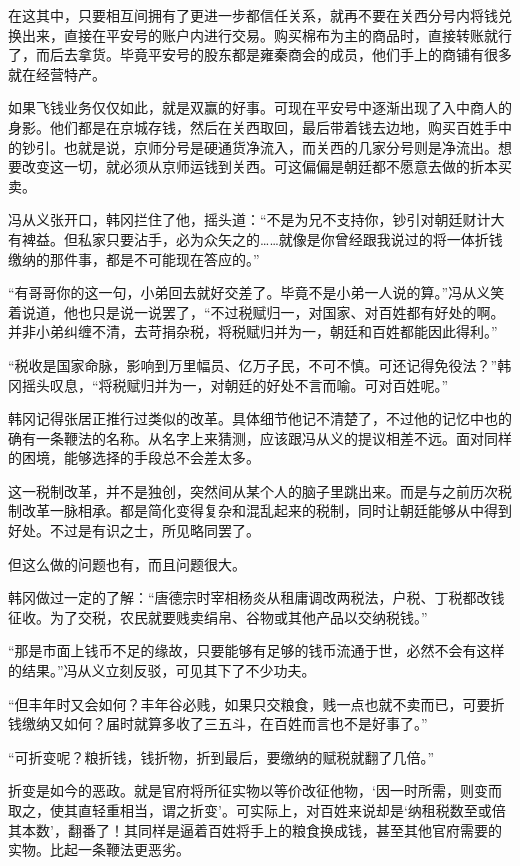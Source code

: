 在这其中，只要相互间拥有了更进一步都信任关系，就再不要在关西分号内将钱兑换出来，直接在平安号的账户内进行交易。购买棉布为主的商品时，直接转账就行了，而后去拿货。毕竟平安号的股东都是雍秦商会的成员，他们手上的商铺有很多就在经营特产。

如果飞钱业务仅仅如此，就是双赢的好事。可现在平安号中逐渐出现了入中商人的身影。他们都是在京城存钱，然后在关西取回，最后带着钱去边地，购买百姓手中的钞引。也就是说，京师分号是硬通货净流入，而关西的几家分号则是净流出。想要改变这一切，就必须从京师运钱到关西。可这偏偏是朝廷都不愿意去做的折本买卖。

冯从义张开口，韩冈拦住了他，摇头道：“不是为兄不支持你，钞引对朝廷财计大有裨益。但私家只要沾手，必为众矢之的……就像是你曾经跟我说过的将一体折钱缴纳的那件事，都是不可能现在答应的。”

“有哥哥你的这一句，小弟回去就好交差了。毕竟不是小弟一人说的算。”冯从义笑着说道，他也只是说一说罢了，“不过税赋归一，对国家、对百姓都有好处的啊。并非小弟纠缠不清，去苛捐杂税，将税赋归并为一，朝廷和百姓都能因此得利。”

“税收是国家命脉，影响到万里幅员、亿万子民，不可不慎。可还记得免役法？”韩冈摇头叹息，“将税赋归并为一，对朝廷的好处不言而喻。可对百姓呢。”

韩冈记得张居正推行过类似的改革。具体细节他记不清楚了，不过他的记忆中也的确有一条鞭法的名称。从名字上来猜测，应该跟冯从义的提议相差不远。面对同样的困境，能够选择的手段总不会差太多。

这一税制改革，并不是独创，突然间从某个人的脑子里跳出来。而是与之前历次税制改革一脉相承。都是简化变得复杂和混乱起来的税制，同时让朝廷能够从中得到好处。不过是有识之士，所见略同罢了。

但这么做的问题也有，而且问题很大。

韩冈做过一定的了解：“唐德宗时宰相杨炎从租庸调改两税法，户税、丁税都改钱征收。为了交税，农民就要贱卖绢帛、谷物或其他产品以交纳税钱。”

“那是市面上钱币不足的缘故，只要能够有足够的钱币流通于世，必然不会有这样的结果。”冯从义立刻反驳，可见其下了不少功夫。

“但丰年时又会如何？丰年谷必贱，如果只交粮食，贱一点也就不卖而已，可要折钱缴纳又如何？届时就算多收了三五斗，在百姓而言也不是好事了。”

“可折变呢？粮折钱，钱折物，折到最后，要缴纳的赋税就翻了几倍。”

折变是如今的恶政。就是官府将所征实物以等价改征他物，‘因一时所需，则变而取之，使其直轻重相当，谓之折变’。可实际上，对百姓来说却是‘纳租税数至或倍其本数’，翻番了！其同样是逼着百姓将手上的粮食换成钱，甚至其他官府需要的实物。比起一条鞭法更恶劣。

